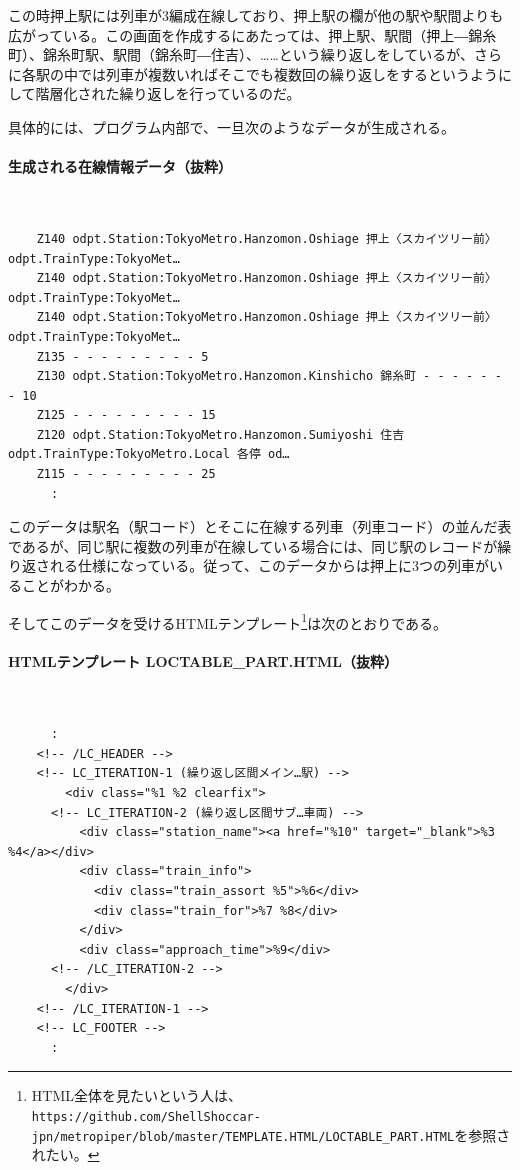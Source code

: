 この時押上駅には列車が3編成在線しており、押上駅の欄が他の駅や駅間よりも広がっている。この画面を作成するにあたっては、押上駅、駅間（押上―錦糸町）、錦糸町駅、駅間（錦糸町―住吉）、……という繰り返しをしているが、さらに各駅の中では列車が複数いればそこでも複数回の繰り返しをするというようにして階層化された繰り返しを行っているのだ。

具体的には、プログラム内部で、一旦次のようなデータが生成される。
\paragraph*{生成される在線情報データ（抜粋）} 　\\
\begin{frameboxit}{160.0mm}
\begin{verbatim}
	Z140 odpt.Station:TokyoMetro.Hanzomon.Oshiage 押上〈スカイツリー前〉 odpt.TrainType:TokyoMet…
	Z140 odpt.Station:TokyoMetro.Hanzomon.Oshiage 押上〈スカイツリー前〉 odpt.TrainType:TokyoMet…
	Z140 odpt.Station:TokyoMetro.Hanzomon.Oshiage 押上〈スカイツリー前〉 odpt.TrainType:TokyoMet…
	Z135 - - - - - - - - - 5
	Z130 odpt.Station:TokyoMetro.Hanzomon.Kinshicho 錦糸町 - - - - - - - 10
	Z125 - - - - - - - - - 15
	Z120 odpt.Station:TokyoMetro.Hanzomon.Sumiyoshi 住吉 odpt.TrainType:TokyoMetro.Local 各停 od…
	Z115 - - - - - - - - - 25
	  :
\end{verbatim}
\end{frameboxit}
このデータは駅名（駅コード）とそこに在線する列車（列車コード）の並んだ表であるが、同じ駅に複数の列車が在線している場合には、同じ駅のレコードが繰り返される仕様になっている。従って、このデータからは押上に3つの列車がいることがわかる。

そしてこのデータを受けるHTMLテンプレート\footnote{HTML全体を見たいという人は、\\ \verb|https://github.com/ShellShoccar-jpn/metropiper/blob/master/TEMPLATE.HTML/LOCTABLE_PART.HTML|を参照されたい。}は次のとおりである。
\paragraph*{HTMLテンプレート LOCTABLE\_{}PART.HTML（抜粋）} 　\\
\begin{frameboxit}{160.0mm}
\begin{verbatim}
	  :
	<!-- /LC_HEADER -->
	<!-- LC_ITERATION-1 (繰り返し区間メイン…駅) -->
	    <div class="%1 %2 clearfix">
	  <!-- LC_ITERATION-2 (繰り返し区間サブ…車両) -->
	      <div class="station_name"><a href="%10" target="_blank">%3 %4</a></div>
	      <div class="train_info">
	        <div class="train_assort %5">%6</div>
	        <div class="train_for">%7 %8</div>
	      </div>
	      <div class="approach_time">%9</div>
	  <!-- /LC_ITERATION-2 -->
	    </div>
	<!-- /LC_ITERATION-1 -->
	<!-- LC_FOOTER -->
	  :
\end{verbatim}
\end{frameboxit}

